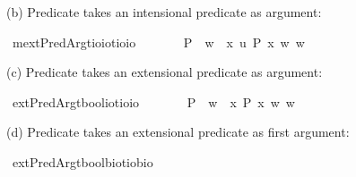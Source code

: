 \begin{isabellebody}
\begin{isamarkuptext}%
(b) Predicate \isa{{\isasymphi}} takes an intensional predicate as argument:%
\end{isamarkuptext}\isamarkuptrue%
\isamarkupfalse%
\ mextPredArg{\isacharcolon}{\isacharcolon}{\isachardoublequoteopen}{\isacharparenleft}{\isacharparenleft}{\isacharprime}t{\isasymRightarrow}io{\isacharparenright}{\isasymRightarrow}io{\isacharparenright}{\isasymRightarrow}{\isacharparenleft}{\isacharprime}t{\isasymRightarrow}io{\isacharparenright}{\isasymRightarrow}io{\isachardoublequoteclose}\ {\isacharparenleft}\ {\isachardoublequoteopen}\isactrlbold {\isasymdown}{\isachardoublequoteclose}\ {}{}{\isacharparenright}\isanewline
\ \ \ {\isachardoublequoteopen}{\isasymphi}\ \isactrlbold {\isasymdown}P\ {\isasymequiv}\ {\isasymlambda}w{\isachardot}\ {\isasymphi}\ {\isacharparenleft}{\isasymlambda}x\ u{\isachardot}\ P\ x\ w{\isacharparenright}\ w{\isachardoublequoteclose}%
\begin{isamarkuptext}%
(c) Predicate \isa{{\isasymphi}} takes an extensional predicate as argument:%
\end{isamarkuptext}\isamarkuptrue%
\isamarkupfalse%
\ extPredArg{\isacharcolon}{\isacharcolon}{\isachardoublequoteopen}{\isacharparenleft}{\isacharparenleft}{\isacharprime}t{\isasymRightarrow}bool{\isacharparenright}{\isasymRightarrow}io{\isacharparenright}{\isasymRightarrow}{\isacharparenleft}{\isacharprime}t{\isasymRightarrow}io{\isacharparenright}{\isasymRightarrow}io{\isachardoublequoteclose}\ {\isacharparenleft}\ {\isachardoublequoteopen}{\isasymdown}{\isachardoublequoteclose}\ {}{}{\isacharparenright}\isanewline
\ \ \ {\isachardoublequoteopen}{\isasymphi}\ {\isasymdown}P\ {\isasymequiv}\ {\isasymlambda}w{\isachardot}\ {\isasymphi}\ {\isacharparenleft}{\isasymlambda}x{\isachardot}\ P\ x\ w{\isacharparenright}\ w{\isachardoublequoteclose}%
\begin{isamarkuptext}%
(d) Predicate \isa{{\isasymphi}} takes an extensional predicate as first argument:%
\end{isamarkuptext}\isamarkuptrue%
\isamarkupfalse%
\ extPredArg{}{\isacharcolon}{\isacharcolon}{\isachardoublequoteopen}{\isacharparenleft}{\isacharparenleft}{\isacharprime}t{\isasymRightarrow}bool{\isacharparenright}{\isasymRightarrow}{\isacharprime}b{\isasymRightarrow}io{\isacharparenright}{\isasymRightarrow}{\isacharparenleft}{\isacharprime}t{\isasymRightarrow}io{\isacharparenright}{\isasymRightarrow}{\isacharprime}b{\isasymRightarrow}io{\isachardoublequoteclose}\ {\isacharparenleft}\ {\isachardoublequoteopen}{\isasymdown}\ {}{}{\isacharparenright}\isanewline

\end{isabellebody}
